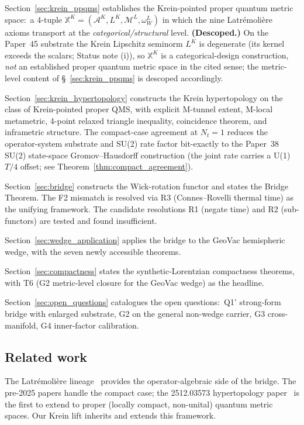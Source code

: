 \documentclass[11pt,a4paper]{article}
\theoremstyle{plain}
\theoremstyle{definition}
\newcommand{\Nt}{N_{t}}
\newcommand{\Acal}{\mathcal{A}}
\newcommand{\Mcal}{\mathcal{M}}
\newcommand{\BWvac}{\omega_{W}^{L}}
\begin{document}
Section~\ref{sec:krein_ppqms} establishes the Krein-pointed proper
quantum metric space:\ a 4-tuple
$\mathbb{X}^{K} = (\Acal^{K}, L^{K}, \Mcal^{L}, \BWvac)$
in which the nine Latr\'emoli\`ere axioms transport at the
\emph{categorical/structural} level. \textbf{(Descoped.)} On the
Paper~45 substrate the Krein Lipschitz seminorm $L^{K}$ is degenerate
(its kernel exceeds the scalars; Status note (i)), so $\mathbb{X}^{K}$
is a categorical-design construction, \emph{not} an established proper
quantum metric space in the cited sense; the metric-level content of
\S~\ref{sec:krein_ppqms} is descoped accordingly.

Section~\ref{sec:krein_hypertopology} constructs the Krein
hypertopology on the class of Krein-pointed proper QMS, with explicit
M-tunnel extent, M-local metametric, 4-point relaxed triangle
inequality, coincidence theorem, and inframetric structure. The
compact-case agreement at $\Nt = 1$ reduces the operator-system
substrate and SU(2) rate factor bit-exactly to the
Paper~38~\cite{paper38} SU(2) state-space Gromov--Hausdorff
construction (the joint rate carries a U(1) $T/4$ offset; see
Theorem~\ref{thm:compact_agreement}).

Section~\ref{sec:bridge} constructs the Wick-rotation functor and
states the Bridge Theorem. The F2 mismatch is resolved via R3
(Connes--Rovelli thermal time) as the unifying framework. The
candidate resolutions R1 (negate time) and R2 (sub-functors) are
tested and found insufficient.

Section~\ref{sec:wedge_application} applies the bridge to the GeoVac
hemispheric wedge, with the seven newly accessible theorems.

Section~\ref{sec:compactness} states the synthetic-Lorentzian
compactness theorems, with T6 (G2 metric-level closure for the GeoVac
wedge) as the headline.

Section~\ref{sec:open_questions} catalogues the open questions:\ Q1'
strong-form bridge with enlarged substrate, G2 on the general
non-wedge carrier, G3 cross-manifold, G4 inner-factor calibration.

\subsection{Related work}
\label{sec:related_work}

The Latr\'emoli\`ere lineage~\cite{latremoliere2018,
latremoliere_metric_st_2017, latremoliere_metric_propinquity_2015,
latremoliere2025_hypertopology, latremoliere_pp_2018af,
farsi_latremoliere2024, farsi_latremoliere2025} provides the
operator-algebraic side of the bridge. The pre-2025 papers handle the
compact case; the 2512.03573 hypertopology paper~\cite{latremoliere2025_hypertopology}
is the first to extend to proper (locally compact, non-unital) quantum
metric spaces. Our Krein lift inherits and extends this framework.
\end{document}
